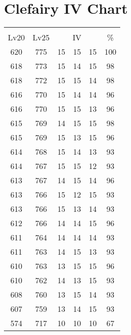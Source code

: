 \documentclass{article}%
\begin{document}
%
\normalsize%
\section{Clefairy IV Chart}%
\label{sec:Clefairy IV Chart}%
\renewcommand{\arraystretch}{1.5}%
\begin{tabular}{|c|c|c|c|c|c|}%
\hline%
\multicolumn{6}{|c|}{\textcolor{white}{ 
\linebreak{Clefairy}
}%
\cellcolor{black}}\\%
\multicolumn{1}{|c}{Lv20}&\multicolumn{1}{c|}{Lv25}&\multicolumn{3}{c|}{IV}&\multicolumn{1}{|c|}{\%}\\%
\hline%
\rowcolor{color100}%
620&775&15&15&15&100\\%
\hline%
\rowcolor{color98}%
618&773&15&14&15&98\\%
\hline%
\rowcolor{color98}%
618&772&15&15&14&98\\%
\hline%
\rowcolor{color96}%
616&770&15&14&14&96\\%
\hline%
\rowcolor{color96}%
616&770&15&15&13&96\\%
\hline%
\rowcolor{color98}%
615&769&14&15&15&98\\%
\hline%
\rowcolor{color96}%
615&769&15&13&15&96\\%
\hline%
\rowcolor{color93}%
614&768&15&14&13&93\\%
\hline%
\rowcolor{color93}%
614&767&15&15&12&93\\%
\hline%
\rowcolor{color96}%
613&767&14&15&14&96\\%
\hline%
\rowcolor{color93}%
613&766&15&12&15&93\\%
\hline%
\rowcolor{color93}%
613&766&15&13&14&93\\%
\hline%
\rowcolor{color96}%
612&766&14&14&15&96\\%
\hline%
\rowcolor{color93}%
611&764&14&14&14&93\\%
\hline%
\rowcolor{color93}%
611&763&14&15&13&93\\%
\hline%
\rowcolor{color96}%
610&763&13&15&15&96\\%
\hline%
\rowcolor{color93}%
610&762&14&13&15&93\\%
\hline%
\rowcolor{color93}%
608&760&13&15&14&93\\%
\hline%
\rowcolor{color93}%
607&759&13&14&15&93\\%
\hline%
\rowcolor{color91}%
574&717&10&10&10&67\\%
\end{tabular}

%
\end{document}
